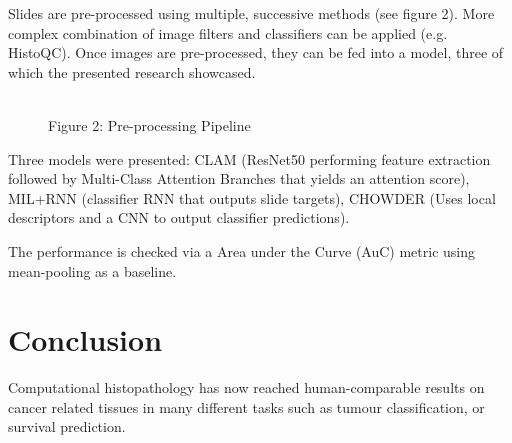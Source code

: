 \documentclass[a4paper]{article}
\begin{document}
Slides are pre-processed using multiple, successive methods (see figure 2). More complex combination of image filters and classifiers can be applied (e.g. HistoQC). Once images are pre-processed, they can be fed into a model, three of which the presented research showcased.\\
\begin{figure}
\centering
{}%
\raisebox{-4ex}{$\to$}%
%
\raisebox{-4ex}{$\to$}%
\raisebox{-4ex}{$\to$}%
\\{\scriptsize Figure 2: Pre-processing Pipeline}
\end{figure}

Three models were presented: CLAM (ResNet50 performing feature extraction followed by Multi-Class Attention Branches that yields an attention score), MIL+RNN (classifier RNN that outputs slide targets), CHOWDER (Uses local descriptors and a CNN to output classifier predictions).

The performance is checked via a Area under the Curve (AuC) metric using mean-pooling as a baseline.
\section{Conclusion}
Computational histopathology has now reached human-comparable results on cancer related tissues in many different tasks such as tumour classification, or survival prediction.
\end{document}
